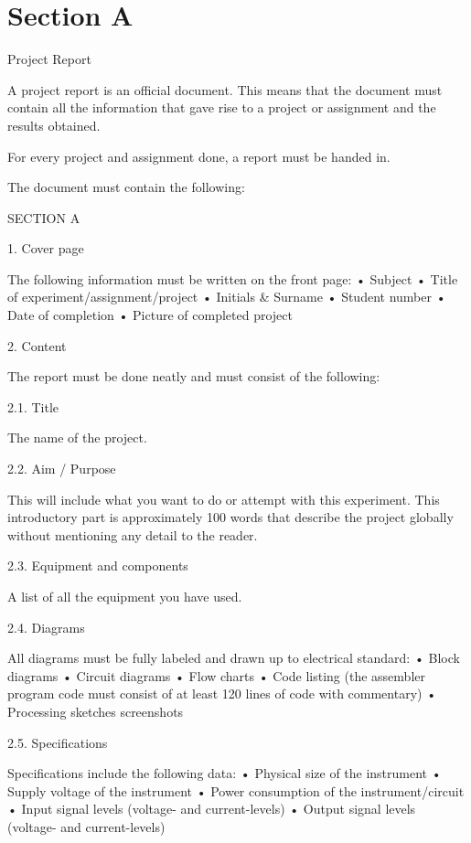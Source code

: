 \documentclass[a4]{article}
\begin{document}


\section{Section A}


Project Report

A project report is an official document. This means that the document must contain all the information that gave rise to a project or assignment and the results obtained.

For every project and assignment done, a report must be handed in.

The document must contain the following:

SECTION A

    1. Cover page

The following information must be written on the front page:
    • Subject
    • Title of experiment/assignment/project
    • Initials & Surname
    • Student number
    • Date of completion
    • Picture of completed project

    2. Content

The report must be done neatly and must consist of the following:

        2.1. Title

The name of the project.

        2.2. Aim / Purpose

This will include what you want to do or attempt with this experiment. This introductory part is approximately 100 words that describe the project globally without mentioning any detail to the reader.

        2.3. Equipment and components

A list of all the equipment you have used.

        2.4. Diagrams

All diagrams must be fully labeled and drawn up to electrical standard:
    • Block diagrams
    • Circuit diagrams
    • Flow charts
    • Code listing (the assembler program code must consist of at least 120 lines of code with commentary)
    • Processing sketches screenshots 

        2.5. Specifications

Specifications include the following data:
    • Physical size of the instrument
    • Supply voltage of the instrument
    • Power consumption of the instrument/circuit
    • Input signal levels (voltage- and current-levels)
    • Output signal levels (voltage- and current-levels)
\end{document}
